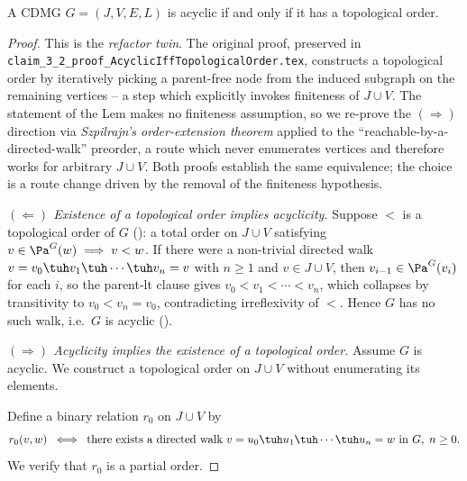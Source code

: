 \documentclass[main]{subfiles}
\begin{document}
\def\rowref{claim\_3\_2}
\label{claim_3_2}

\begin{Lem}[AcyclicIffTopologicalOrder]
        A CDMG  $G=(J,V,E,L)$ is acyclic if and only if it has a topological order.
\end{Lem}

\begin{proof}
This is the \emph{refactor twin}. The original proof, preserved in
\texttt{claim\_3\_2\_proof\_AcyclicIffTopologicalOrder.tex}, constructs
a topological order by iteratively picking a parent-free node from the
induced subgraph on the remaining vertices -- a step which explicitly
invokes finiteness of $J \cup V$. The statement of the Lem makes no
finiteness assumption, so we re-prove the $(\Rightarrow)$ direction via
\emph{Szpilrajn's order-extension theorem} applied to the
``reachable-by-a-directed-walk'' preorder, a route which never enumerates
vertices and therefore works for arbitrary $J \cup V$. Both proofs
establish the same equivalence; the choice is a route change driven by
the removal of the finiteness hypothesis.

\medskip
\noindent\emph{$(\Leftarrow)$ Existence of a topological order implies acyclicity.}
Suppose $<$ is a topological order of $G$ (): a total
order on $J \cup V$ satisfying $v \in \Pa^G(w) \implies v < w$. If there
were a non-trivial directed walk $v = v_0 \tuh v_1 \tuh \cdots \tuh v_n = v$
with $n \geq 1$ and $v \in J \cup V$, then $v_{i-1} \in \Pa^G(v_i)$ for
each $i$, so the parent-lt clause gives $v_0 < v_1 < \cdots < v_n$, which
collapses by transitivity to $v_0 < v_n = v_0$, contradicting
irreflexivity of $<$. Hence $G$ has no such walk, i.e.\ $G$ is acyclic
().

\medskip
\noindent\emph{$(\Rightarrow)$ Acyclicity implies the existence of a topological order.}
Assume $G$ is acyclic. We construct a topological order on $J \cup V$
without enumerating its elements.

Define a binary relation $r_0$ on $J \cup V$ by
\[
  r_0(v, w) \;\iff\; \text{there exists a directed walk } v = u_0 \tuh u_1 \tuh \cdots \tuh u_n = w \text{ in } G,\; n \geq 0.
\]
We verify that $r_0$ is a partial order.


\end{proof}
\end{document}
